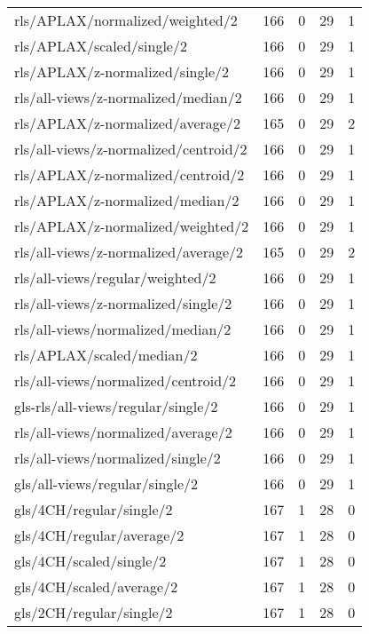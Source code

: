 \begin{longtable}{lrrrr}
    rls/APLAX/normalized/weighted/2           & 166 &  0 & 29 &  1 \\
    rls/APLAX/scaled/single/2                 & 166 &  0 & 29 &  1 \\
    rls/APLAX/z-normalized/single/2           & 166 &  0 & 29 &  1 \\
    rls/all-views/z-normalized/median/2       & 166 &  0 & 29 &  1 \\
    rls/APLAX/z-normalized/average/2          & 165 &  0 & 29 &  2 \\
    rls/all-views/z-normalized/centroid/2     & 166 &  0 & 29 &  1 \\
    rls/APLAX/z-normalized/centroid/2         & 166 &  0 & 29 &  1 \\
    rls/APLAX/z-normalized/median/2           & 166 &  0 & 29 &  1 \\
    rls/APLAX/z-normalized/weighted/2         & 166 &  0 & 29 &  1 \\
    rls/all-views/z-normalized/average/2      & 165 &  0 & 29 &  2 \\
    rls/all-views/regular/weighted/2          & 166 &  0 & 29 &  1 \\
    rls/all-views/z-normalized/single/2       & 166 &  0 & 29 &  1 \\
    rls/all-views/normalized/median/2         & 166 &  0 & 29 &  1 \\
    rls/APLAX/scaled/median/2                 & 166 &  0 & 29 &  1 \\
    rls/all-views/normalized/centroid/2       & 166 &  0 & 29 &  1 \\
    gls-rls/all-views/regular/single/2        & 166 &  0 & 29 &  1 \\
    rls/all-views/normalized/average/2        & 166 &  0 & 29 &  1 \\
    rls/all-views/normalized/single/2         & 166 &  0 & 29 &  1 \\
    gls/all-views/regular/single/2            & 166 &  0 & 29 &  1 \\
    gls/4CH/regular/single/2                  & 167 &  1 & 28 &  0 \\
    gls/4CH/regular/average/2                 & 167 &  1 & 28 &  0 \\
    gls/4CH/scaled/single/2                   & 167 &  1 & 28 &  0 \\
    gls/4CH/scaled/average/2                  & 167 &  1 & 28 &  0 \\
    gls/2CH/regular/single/2                  & 167 &  1 & 28 &  0 \\

\end{longtable}
